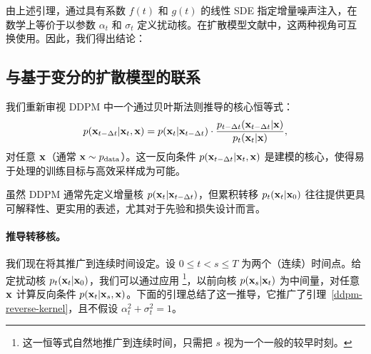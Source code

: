 

由上述引理，通过具有系数 $f(t)$ 和 $g(t)$ 的线性 SDE 指定增量噪声注入，在数学上等价于以参数 $\alpha_t$ 和 $\sigma_t$ 定义扰动核。在扩散模型文献中，这两种视角可互换使用。因此，我们得出结论：


\subsection{与基于变分的扩散模型的联系}\label{subsec:connection-vdm}
我们重新审视 DDPM 中一个通过贝叶斯法则推导的核心恒等式：
\begin{align}\label{eq:ddpm-reverse-condition-kernel}
    p({\mathbf{x}}_{t-\Delta t}|{\mathbf{x}}_t, {\mathbf{x}}) = p({\mathbf{x}}_t|{\mathbf{x}}_{t-\Delta t}) \cdot \frac{p_{t-\Delta t}({\mathbf{x}}_{t-\Delta t}|{\mathbf{x}})}{p_t({\mathbf{x}}_t|{\mathbf{x}})},
\end{align}
对任意 ${\mathbf{x}}$（通常 ${\mathbf{x}}\sim p_{\mathrm{data}}$）。这一反向条件 $ p({\mathbf{x}}_{t-\Delta t} | {\mathbf{x}}_t, {\mathbf{x}}) $ 是建模的核心，使得易于处理的训练目标与高效采样成为可能。

虽然 DDPM 通常先定义增量核 $p({\mathbf{x}}_t|{\mathbf{x}}_{t-\Delta t})$，但累积转移 $p_t({\mathbf{x}}_t|{\mathbf{x}}_0)$ 往往提供更具可解释性、更实用的表述，尤其对于先验和损失设计而言。

\paragraph{推导转移核。}
我们现在将其推广到连续时间设定。设 $0 \leq t < s \leq T$ 为两个（连续）时间点。给定扰动核 $p_t({\mathbf{x}}_t|{\mathbf{x}}_0)$，我们可以通过应用 \footnote{这一恒等式自然地推广到连续时间，只需把 $s$ 视为一个一般的较早时刻。}，以前向核 $p({\mathbf{x}}_s|{\mathbf{x}}_t)$ 为中间量，对任意 ${\mathbf{x}}$ 计算反向条件 $p({\mathbf{x}}_t|{\mathbf{x}}_s, {\mathbf{x}})$。下面的引理总结了这一推导，它推广了引理~\ref{ddpm-reverse-kernel}，且不假设 $\alpha_t^2 + \sigma_t^2 = 1$。

